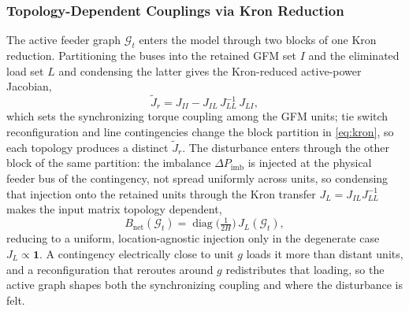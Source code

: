 \documentclass[lettersize,journal]{IEEEtran}
\begin{document}
	\subsubsection{Topology-Dependent Couplings via Kron Reduction}
	The active feeder graph $\mathcal{G}_t$ enters the model through two blocks of one Kron reduction. Partitioning the buses into the retained GFM set $I$ and the eliminated load set $L$ and condensing the latter \cite{luo2014kronmicrogrid,ajala2023gfmreduction} gives the Kron-reduced active-power Jacobian,
	\begin{equation}
		\tilde{J}_r = J_{II}-J_{IL}\,J_{LL}^{-1}\,J_{LI},
		\label{eq:kron}
	\end{equation}
	which sets the synchronizing torque coupling among the GFM units; tie switch reconfiguration and line contingencies change the block partition in \eqref{eq:kron}, so each topology produces a distinct $\tilde{J}_r$. The disturbance enters through the other block of the same partition: the imbalance $\Delta P_{\mathrm{imb}}$ is injected at the physical feeder bus of the contingency, not spread uniformly across units, so condensing that injection onto the retained units through the Kron transfer $J_L=J_{IL}J_{LL}^{-1}$ makes the input matrix topology dependent,
	\begin{equation}
		B_{\mathrm{net}}(\mathcal{G}_t)=\operatorname{diag}\!\big(\tfrac{1}{2H}\big)\,J_L(\mathcal{G}_t),
		\label{eq:bnet}
	\end{equation}
	reducing to a uniform, location-agnostic injection only in the degenerate case $J_L\propto\mathbf{1}$. A contingency electrically close to unit $g$ loads it more than distant units, and a reconfiguration that reroutes around $g$ redistributes that loading, so the active graph shapes both the synchronizing coupling and where the disturbance is felt.
	
\end{document}
